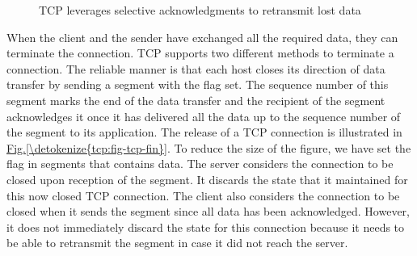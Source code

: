 \documentclass[letterpaper,10pt,english]{sphinxmanual}
\begin{document}
\begin{figure}[htbp]\centering\capstart{}\caption{TCP leverages selective acknowledgments to retransmit lost data}\label{\detokenize{tcp:id11}}\label{\detokenize{tcp:fig-tcp-retrans-sack}}\end{figure}
\sphinxAtStartPar
When the client and the sender have exchanged all the required data, they can terminate the connection. TCP supports two different methods to terminate a connection. The reliable manner is that each host closes its direction of data transfer by sending a segment with the  flag set. The sequence number of this segment marks the end of the data transfer and the recipient of the segment acknowledges it once it has delivered all the data up to the sequence number of the  segment to its application. The release of a TCP connection is illustrated in \hyperref[\detokenize{tcp:fig-tcp-fin}]{Fig.\@ \ref{\detokenize{tcp:fig-tcp-fin}}}. To reduce the size of the figure, we have set the  flag in segments that contains data. The server considers the connection to be closed upon reception of the  segment. It discards the state that it maintained for this now closed TCP connection. The client also considers the connection to be closed when it sends the  segment since all data has been acknowledged. However, it does not immediately discard the state for this connection because it needs to be able to retransmit the  segment in case it did not reach the server.
\end{document}
